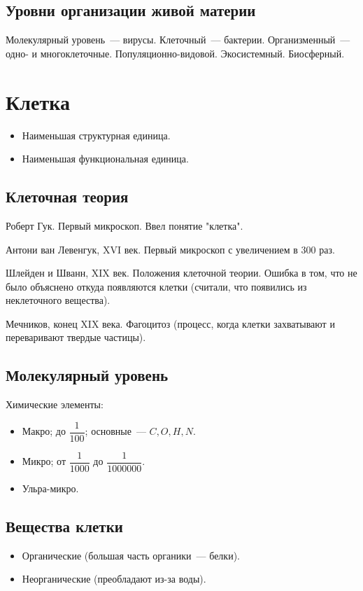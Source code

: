 \documentclass[12pt]{article}
\begin{document}
	\subsection{Уровни организации живой материи}
	Молекулярный уровень~--- вирусы. Клеточный~--- бактерии. Организменный~--- одно- и многоклеточные. Популяционно-видовой. Экосистемный. Биосферный.
	\section{Клетка}
	\begin{itemize}
		\item Наименьшая структурная единица.
		\item Наименьшая функциональная единица.
	\end{itemize}
	\subsection{Клеточная теория}
	\begin{person}
		Роберт Гук. Первый микроскоп. Ввел понятие "клетка".
	\end{person}
	\begin{person}
		Антони ван Левенгук, XVI век. Первый микроскоп с увеличением в $300$ раз.
	\end{person}
	\begin{person}
		Шлейден и Шванн, XIX век. Положения клеточной теории. Ошибка в том, что не было объяснено откуда появляются клетки (считали, что появились из неклеточного вещества).
	\end{person}
	\begin{person}
		Мечников, конец XIX века. Фагоцитоз (процесс, когда клетки захватывают и переваривают твердые частицы).
	\end{person}
	\subsection{Молекулярный уровень}
	Химические элементы:
	\begin{itemize}
		\item Макро; до $\dfrac{1}{100}$; основные~--- $C, O, H, N$.
		\item Микро; от $\dfrac{1}{1000}$ до $\dfrac{1}{1000000}$.
		\item Ульра-микро.
	\end{itemize}
	\subsection{Вещества клетки}
	\begin{itemize}
		\item Органические (большая часть органики~--- белки).
		\item Неорганические (преобладают из-за воды).
	\end{itemize}
\end{document}
